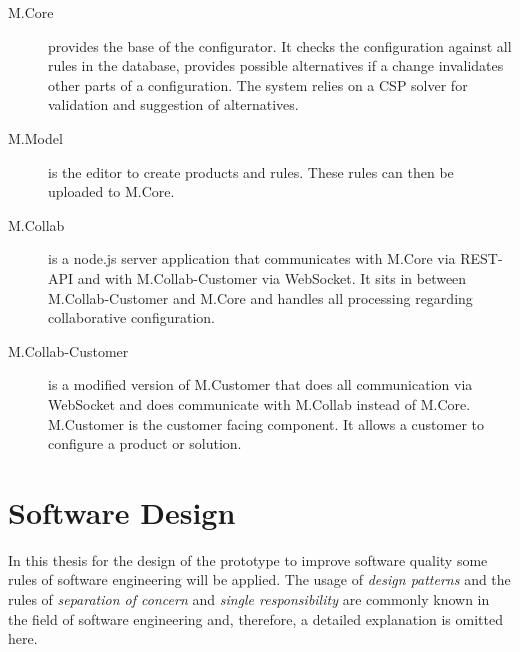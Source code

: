 \begin{description}
    \item[M.Core] provides the base of the configurator. It checks the configuration against all rules in the database, provides possible alternatives if a change invalidates other parts of a configuration. The system relies on a CSP solver for validation and suggestion of alternatives.
    \item[M.Model] is the editor to create products and rules. These rules can then be uploaded to M.Core.
    \item[M.Collab] is a node.js server application that communicates with M.Core via REST-API and with M.Collab-Customer via WebSocket. It sits in between M.Collab-Customer and M.Core and handles all processing regarding collaborative configuration.
    \item[M.Collab-Customer] is a modified version of M.Customer that does all communication via WebSocket and does communicate with M.Collab instead of M.Core. M.Customer is the customer facing component. It allows a customer to configure a product or solution.
\end{description}

\section{Software Design}
\label{sec:Foundations:BaseSystem}

In this thesis for the design of the prototype to improve software quality some rules of software engineering will be applied. The usage of \emph{design patterns} \cite{gamma2015design} and the rules of \emph{separation of concern} \cite{de2002importance} and \emph{single responsibility} \cite{martinCleanArchitectureCraftsman2017} are commonly known in the field of software engineering and, therefore, a detailed explanation is omitted here.


